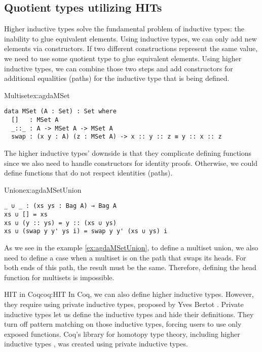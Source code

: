 \subsection{Quotient types utilizing HITs}
Higher inductive types solve the fundamental problem of inductive types: the inability to glue equivalent elements. Using inductive types, we can only add new elements via constructors. If two different constructions represent the same value, we need to use some quotient type to glue equivalent elements. Using higher inductive types, we can combine those two steps and add constructors for additional equalities (paths) for the inductive type that is being defined.
\begin{example}{Multiset}{ex:agdaMSet}
\begin{verbatim}
data MSet (A : Set) : Set where
  []   : MSet A
  _::_ : A -> MSet A -> MSet A 
  swap : (x y : A) (z : MSet A) -> x :: y :: z ≡ y :: x :: z
\end{verbatim}
\end{example}
The higher inductive types' downside is that they complicate defining functions since we also need to handle constructors for identity proofs. Otherwise, we could define functions that do not respect identities (paths).
\begin{example}{Union}{ex:agdaMSetUnion}
\begin{verbatim}
_ ∪ _ : (xs ys : Bag A) → Bag A
xs ∪ [] = xs
xs ∪ (y :: ys) = y :: (xs ∪ ys)
xs ∪ (swap y y' ys i) = swap y y' (xs ∪ ys) i
\end{verbatim}
\end{example}
As we see in the example \ref{ex:agdaMSetUnion}, to define a multiset union, we also need to define a case when a multiset is on the path that swaps its heads. For both ends of this path, the result must be the same. Therefore, defining the head function for multisets is impossible.
\begin{coq}{HIT in Coq}{coq:HIT}
In Coq, we can also define higher inductive types. However, they require using private inductive types, proposed by Yves Bertot \cite{PrivetInductive}. Private inductive types let us define the inductive types and hide their definitions. They turn off pattern matching on those inductive types, forcing users to use only exposed functions. Coq's library for homotopy type theory, including higher inductive types \cite{HoTTinCoq}, was created using private inductive types.
\end{coq}